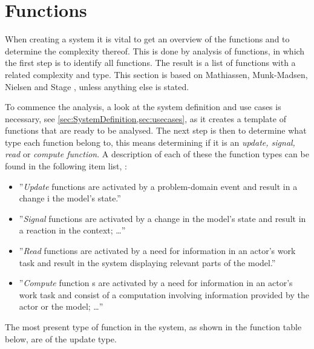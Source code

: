 \section{Functions}
When creating a system it is vital to get an overview of the functions and to determine the complexity thereof.
This is done by analysis of functions, in which the first step is to identify all functions.
The result is a list of functions with a related complexity and type.
This section is based on Mathiassen, Munk-Madsen, Nielsen and Stage \citep[ch.~7]{Rod-Aalborg}, unless anything else is stated.

To commence the analysis, a look at the system definition and use cases is necessary, see \cref{sec:SystemDefinition,sec:usecases}, as it creates a template of functions that are ready to be analysed.
The next step is then to determine what type each function belong to, this means determining if it is an \textit{update, signal, read} or \textit{compute function}.
A description of each of these the function types can be found in the following item list, \citep[p.~140]{Rod-Aalborg}:
\begin{itemize}
	\item 
	''\textit{Update} functions are  activated by a problem-domain event and result in a change i the model's state.''
	\item 
	''\textit{Signal} functions are activated by a change in the model's state and result in a reaction in the context; \ldots''
	\item
	''\textit{Read} functions are activated by a need for information in an actor's work task and result in the system displaying relevant parts of the model.''
	\item
	''\textit{Compute} function s are activated by a need for information in an actor's work task and consist of a computation involving information provided by the actor or the model; \ldots''
\end{itemize}


The most present type of function in the system, as shown in the function table below, are of the update type.


